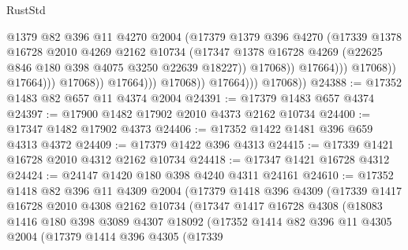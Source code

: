 \begin{lexlean}{RustStd}
\begin{coremodule}
                                            @1379
                                            @82
                                            @396
                                            @11
                                            @4270
                                            @2004
                                            (@17379
                                              @1379
                                              @396
                                              @4270
                                              (@17339
                                                @1378
                                                @16728
                                                @2010
                                                @4269
                                                @2162
                                                @10734
                                                (@17347
                                                  @1378
                                                  @16728
                                                  @4269
                                                  (@22625 @846 @180 @398 @4075 @3250 @22639 @18227))
                                                @17068))
                                            @17664)))
                                      @17068))
                                  @17664)))
                            @17068))
                        @17664)))
                  @17068))
              @17664)))
        @17068))
@24388 := @17352 @1483 @82 @657 @11 @4374 @2004
@24391 := @17379 @1483 @657 @4374
@24397 := @17900 @1482 @17902 @2010 @4373 @2162 @10734
@24400 := @17347 @1482 @17902 @4373
@24406 := @17352 @1422 @1481 @396 @659 @4313 @4372
@24409 := @17379 @1422 @396 @4313
@24415 := @17339 @1421 @16728 @2010 @4312 @2162 @10734
@24418 := @17347 @1421 @16728 @4312
@24424 := @24147 @1420 @180 @398 @4240 @4311 @24161
@24610 := @17352
    @1418
    @82
    @396
    @11
    @4309
    @2004
    (@17379
      @1418
      @396
      @4309
      (@17339
        @1417
        @16728
        @2010
        @4308
        @2162
        @10734
        (@17347
          @1417
          @16728
          @4308
          (@18083
            @1416
            @180
            @398
            @3089
            @4307
            @18092
            (@17352
              @1414
              @82
              @396
              @11
              @4305
              @2004
              (@17379
                @1414
                @396
                @4305
                (@17339

\end{coremodule}
\end{lexlean}
